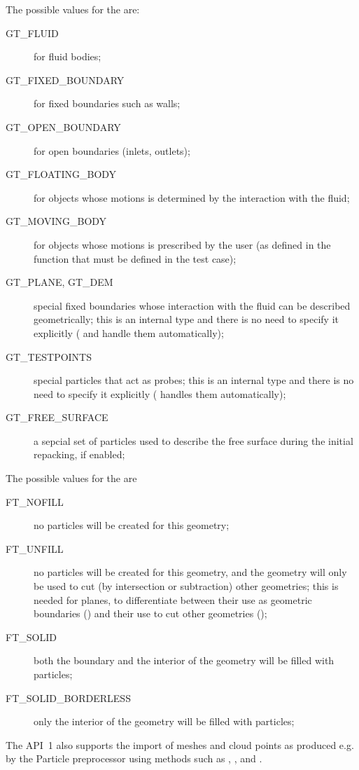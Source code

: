 \documentclass{../GPUSPHtemplate}
\begin{document}
The possible values for the  are:
\begin{description}
\item[GT_FLUID] for fluid bodies;
\item[GT_FIXED_BOUNDARY] for fixed boundaries such as walls;
\item[GT_OPEN_BOUNDARY] for open boundaries (inlets, outlets);
\item[GT_FLOATING_BODY] for objects whose motions is determined
by the interaction with the fluid;
\item[GT_MOVING_BODY] for objects whose motions is prescribed by the
user (as defined in the  function that must
be defined in the test case);
\item[GT_PLANE, GT_DEM] special fixed boundaries whose interaction with
the fluid can be described geometrically; this is an internal type and
there is no need to specify it explicitly ( and
 handle them automatically);
\item[GT_TESTPOINTS] special particles that act as probes; this is an
internal type and there is no need to specify it explicitly
( handles them automatically);
\item[GT_FREE_SURFACE] a sepcial set of particles used to describe the
free surface during the initial repacking, if enabled;
\end{description}

The possible values for the  are
\begin{description}
\item[FT_NOFILL] no particles will be created for this geometry;
\item[FT_UNFILL] no particles will be created for this geometry, and the
geometry will only be used to cut (by intersection or subtraction) other
geometries; this is needed for planes, to differentiate between their
use as geometric boundaries () and their use to cut other
geometries ();
\item[FT_SOLID] both the boundary and the interior of the geometry will
be filled with particles;
\item[FT_SOLID_BORDERLESS] only the interior of the geometry will be
filled with particles;
\end{description}

The  API~1 also supports the import of meshes and cloud
points as produced e.g. by the Particle preprocessor using methods such
as , ,  and
.
\end{document}
